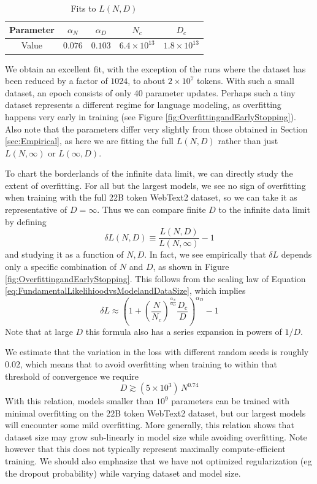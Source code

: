 \documentclass[english]{article}
\newcommand{\be}{\begin{equation}}
\newcommand{\ee}{\end{equation}}
\begin{document}
\begin{table}[h!]
\centering
\vspace{-0.5em}
\begin{tabular}{|c| c | c | c | c|} 
 \hline
Parameter & $\alpha_N$ & $\alpha_D$ & $N_c$ & $D_c$ \\ [0.5ex] 
 \hline\hline
Value  & $0.076$ & $0.103$ & $6.4 \times 10^{13}$ & $1.8 \times 10^{13}$ \\ 
 \hline
\end{tabular}
\vspace{0.5em}
\caption{Fits to $L(N, D)$}
\vspace{-1em}
\end{table}

 We obtain an excellent fit, with the exception of the runs where the dataset has been reduced by a factor of $1024$, to about $2 \times 10^7$ tokens.  With such a small dataset, an epoch consists of only 40 parameter updates.  Perhaps such a tiny dataset represents a different regime for language modeling, as overfitting happens very early in training (see Figure \ref{fig:OverfittingandEarlyStopping}).  Also note that the parameters differ very slightly from those obtained in Section \ref{sec:Empirical}, as here we are fitting the full $L(N,D)$ rather than just $L(N, \infty)$ or $L(\infty, D)$.   

To chart the borderlands of the infinite data limit, we can directly study the extent of overfitting.  For all but the largest models, we see no sign of overfitting when training with the full 22B token WebText2 dataset, so we can take it as representative of $D=\infty$.  Thus we can compare finite $D$ to the infinite data limit by defining
\be
\delta L(N, D) \equiv \frac{L(N, D)}{L(N, \infty)} - 1
\ee
and studying it as a function of $N, D$.   In fact, we see empirically that $\delta L$ depends only a specific combination of $N$ and $D$, as shown in Figure \ref{fig:OverfittingandEarlyStopping}.  This follows from the scaling law of Equation \eqref{eq:FundamentalLikelihioodvsModelandDataSize}, which implies
\be
\label{eq:OverfittingPrediction}
\delta L \approx  \left( 1 +  \left(\frac{N}{N_c} \right)^{\frac{\alpha_N}{\alpha_D}} \frac{D_c}{D} \right)^{\alpha_D} - 1 
\ee
Note that at large $D$ this formula also has a series expansion in powers of $1/D$.

We estimate that the variation in the loss with different random seeds is roughly $0.02$, which means that to avoid overfitting when training to within that threshold of convergence we require 
\be
D \gtrsim (5 \times 10^3) \, N^{0.74}
\ee
With this relation, models smaller than $10^9$ parameters can be trained with minimal overfitting on the 22B token WebText2 dataset, but our largest models will encounter some mild overfitting.  More generally, this relation shows that dataset size may grow sub-linearly in model size while avoiding overfitting.  Note however that this does not typically represent maximally compute-efficient training.  We should also emphasize that we have not optimized regularization (eg the dropout probability) while varying dataset and model size.
\end{document}

